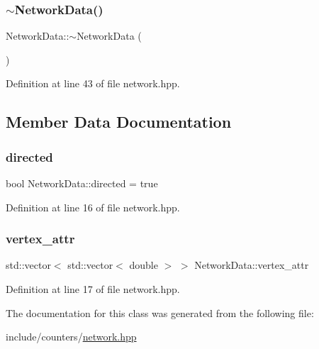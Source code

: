 \subsubsection{\texorpdfstring{$\sim$\+Network\+Data()}{~NetworkData()}}
{\footnotesize\ttfamily Network\+Data\+::$\sim$\+Network\+Data (\begin{DoxyParamCaption}{ }\end{DoxyParamCaption})\hspace{0.3cm}{\ttfamily [inline]}}



Definition at line 43 of file network.\+hpp.



\subsection{Member Data Documentation}
\mbox{\label{class_network_data_a5e67b89f22ad1151680a5f4428c6c780}} 
\subsubsection{\texorpdfstring{directed}{directed}}
{\footnotesize\ttfamily bool Network\+Data\+::directed = true}



Definition at line 16 of file network.\+hpp.

\mbox{\label{class_network_data_a3dc3e5549abc6daa85f30dbdc504ecac}} 
\subsubsection{\texorpdfstring{vertex\+\_\+attr}{vertex\_attr}}
{\footnotesize\ttfamily std\+::vector$<$ std\+::vector$<$ double $>$ $>$ Network\+Data\+::vertex\+\_\+attr}



Definition at line 17 of file network.\+hpp.



The documentation for this class was generated from the following file\+:\begin{DoxyCompactItemize}
\item 
include/counters/\hyperlink{network_8hpp}{network.\+hpp}\end{DoxyCompactItemize}
